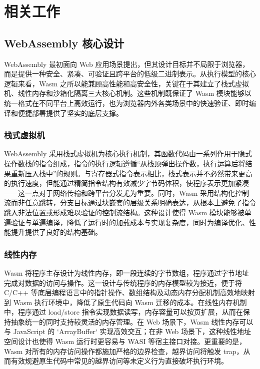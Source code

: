 \chapter{相关工作}

\label{cha:ralated work}


\section{WebAssembly 核心设计}

WebAssembly 最初面向 Web 应用场景提出，但其设计目标并不局限于浏览器，而是提供一种安全、紧凑、可验证且跨平台的低级二进制表示\cite{haas2017bringing}。从执行模型的核心逻辑来看，Wasm 之所以能兼顾高性能和高安全性，关键在于其建立了栈式虚拟机、线性内存和沙箱化隔离三大核心机制。这些机制既保证了 Wasm 模块能够以统一格式在不同平台上高效运行，也为浏览器内外各类场景中的快速验证、即时编译和便捷部署提供了坚实的底层支撑\cite{mao2024ewapa}。

\subsection{栈式虚拟机}

WebAssembly 采用栈式虚拟机为核心执行机制，其函数代码由一系列作用于隐式操作数栈的指令组成，指令的执行逻辑遵循“从栈顶弹出操作数，执行运算后将结果重新压入栈中”的规则\cite{haas2017bringing}。与寄存器式指令表示相比，栈式表示并不必然带来更高的执行速度，但能通过精简指令结构有效减少字节码体积，使程序表示更加紧凑——这一点对于网络传输和跨平台分发尤为重要。同时，Wasm 采用结构化控制流而非任意跳转，分支目标通过块嵌套的层级关系明确表达，从根本上避免了指令跳入非法位置或形成难以验证的控制流结构。这种设计使得 Wasm 模块能够被单遍验证与单遍编译，降低了运行时的加载成本与实现复杂度，同时为编译优化、性能提升提供了良好的结构基础。

\subsection{线性内存}

Wasm 将程序主存设计为线性内存，即一段连续的字节数组，程序通过字节地址完成对数据的访问与操作\cite{haas2017bringing}。这一设计与传统程序的内存模型较为接近，便于将 C/C++ 等底层编程语言中的指针操作、数组结构及动态内存分配机制高效地映射到 Wasm 执行环境中，降低了原生代码向 Wasm 迁移的成本。在线性内存机制中，程序通过 load/store 指令实现数据读写，内存容量可以按页扩展，从而在保持抽象统一的同时支持较灵活的内存管理。在 Web 场景下，Wasm 线性内存可以与 JavaScript 的 `ArrayBuffer` 实现高效交互；在非 Web 场景下，这种线性地址空间设计也使得 Wasm 运行时更容易与 WASI 等宿主接口对接。更重要的是，Wasm 对所有的内存访问操作都施加严格的边界检查，越界访问将触发 trap，从而有效规避原生代码中常见的越界访问等未定义行为直接破坏执行环境。

